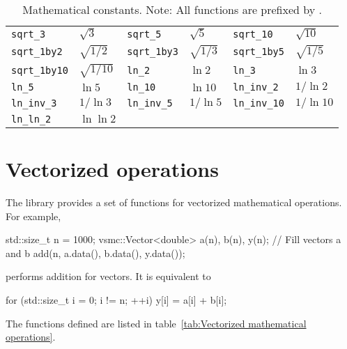 \begin{table}[ht]
\begin{tabu}{X[2l]X[l]X[2l]X[l]X[2l]X[l]}
    \texttt{sqrt\_3}        & $\sqrt{3}$         &
    \texttt{sqrt\_5}        & $\sqrt{5}$         &
    \texttt{sqrt\_10}       & $\sqrt{10}$        \\
    \texttt{sqrt\_1by2}     & $\sqrt{1/2}$       &
    \texttt{sqrt\_1by3}     & $\sqrt{1/3}$       &
    \texttt{sqrt\_1by5}     & $\sqrt{1/5}$       \\
    \texttt{sqrt\_1by10}    & $\sqrt{1/10}$      &
    \texttt{ln\_2}          & $\ln{2}$           &
    \texttt{ln\_3}          & $\ln{3}$           \\
    \texttt{ln\_5}          & $\ln{5}$           &
    \texttt{ln\_10}         & $\ln{10}$          &
    \texttt{ln\_inv\_2}     & $1/\ln{2}$         \\
    \texttt{ln\_inv\_3}     & $1/\ln{3}$         &
    \texttt{ln\_inv\_5}     & $1/\ln{5}$         &
    \texttt{ln\_inv\_10}    & $1/\ln{10}$        \\
    \texttt{ln\_ln\_2}      & $\ln\ln{2}$        &
    &                    &
    &                    \\
    \bottomrule
  \end{tabu}
  \caption{Mathematical constants. Note: All functions are prefixed by
    .}
  \label{tab:Mathematical constants}
\end{table}

\section{Vectorized operations}
\label{sec:Vectorized operations}

The library provides a set of functions for vectorized mathematical operations.
For example,
\begin{cppcode}
  std::size_t n = 1000;
  vsmc::Vector<double> a(n), b(n), y(n);
  // Fill vectors a and b
  add(n, a.data(), b.data(), y.data());
\end{cppcode}
performs addition for vectors. It is equivalent to
\begin{cppcode}
  for (std::size_t i = 0; i != n; ++i)
      y[i] = a[i] + b[i];
\end{cppcode}
The functions defined are listed in table~\ref{tab:Vectorized mathematical
  operations}.

